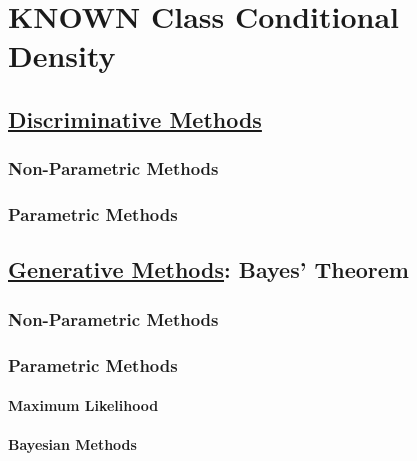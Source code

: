 \documentclass{book}
\begin{document}
\part{KNOWN Class Conditional Density}

\chapter{\underline{Discriminative Methods}}
\section{Non-Parametric Methods}

\section{Parametric Methods}

\chapter{\underline{Generative Methods}: Bayes' Theorem}
\section{Non-Parametric Methods}

\section{Parametric Methods}

\subsection{Maximum Likelihood}

\subsection{Bayesian Methods}



\end{document}
